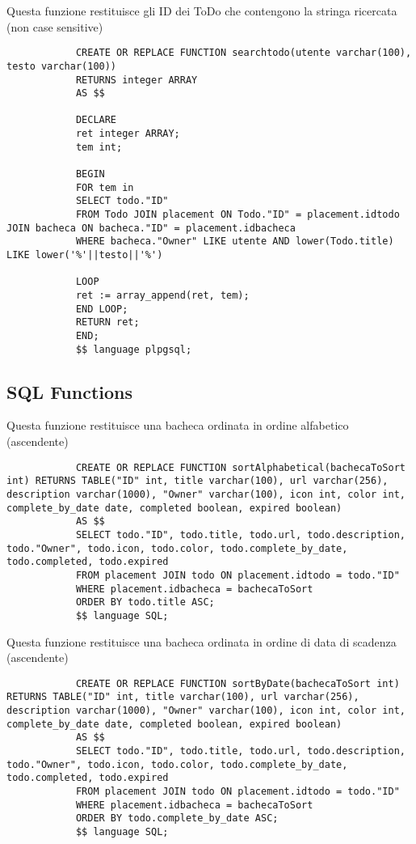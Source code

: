 \documentclass{article}
\begin{document}
		Questa funzione restituisce gli ID dei ToDo che contengono la stringa ricercata (non case sensitive)
			\begin{lstlisting}
			CREATE OR REPLACE FUNCTION searchtodo(utente varchar(100), testo varchar(100))
			RETURNS integer ARRAY
			AS $$
			
			DECLARE
			ret integer ARRAY;
			tem int;
			
			BEGIN
			FOR tem in 
			SELECT todo."ID" 
			FROM Todo JOIN placement ON Todo."ID" = placement.idtodo JOIN bacheca ON bacheca."ID" = placement.idbacheca
			WHERE bacheca."Owner" LIKE utente AND lower(Todo.title) LIKE lower('%'||testo||'%')
			
			LOOP
			ret := array_append(ret, tem);
			END LOOP;
			RETURN ret;
			END;
			$$ language plpgsql;
		\end{lstlisting}
		
		\subsection{SQL Functions}
		
		Questa funzione restituisce una bacheca ordinata in ordine alfabetico (ascendente)
			\begin{lstlisting}
			CREATE OR REPLACE FUNCTION sortAlphabetical(bachecaToSort int) RETURNS TABLE("ID" int, title varchar(100), url varchar(256), description varchar(1000), "Owner" varchar(100), icon int, color int, complete_by_date date, completed boolean, expired boolean)
			AS $$
			SELECT todo."ID", todo.title, todo.url, todo.description, todo."Owner", todo.icon, todo.color, todo.complete_by_date, todo.completed, todo.expired
			FROM placement JOIN todo ON placement.idtodo = todo."ID"
			WHERE placement.idbacheca = bachecaToSort
			ORDER BY todo.title ASC;
			$$ language SQL;
		\end{lstlisting}
		\hfill \linebreak[2]
		
		Questa funzione restituisce una bacheca ordinata in ordine di data di scadenza (ascendente)
			\begin{lstlisting}
			CREATE OR REPLACE FUNCTION sortByDate(bachecaToSort int) RETURNS TABLE("ID" int, title varchar(100), url varchar(256), description varchar(1000), "Owner" varchar(100), icon int, color int, complete_by_date date, completed boolean, expired boolean)
			AS $$
			SELECT todo."ID", todo.title, todo.url, todo.description, todo."Owner", todo.icon, todo.color, todo.complete_by_date, todo.completed, todo.expired
			FROM placement JOIN todo ON placement.idtodo = todo."ID"
			WHERE placement.idbacheca = bachecaToSort
			ORDER BY todo.complete_by_date ASC;
			$$ language SQL;
		\end{lstlisting}
		\hfill \linebreak[2]
		
\end{document}
